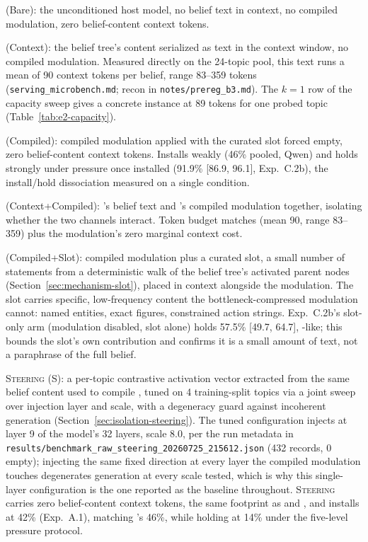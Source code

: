 \condA{} (Bare): the unconditioned host model, no belief text in context, no compiled
modulation, zero belief-content context tokens.

\condB{} (Context): the belief tree's content serialized as text in the context window,
no compiled modulation. Measured directly on the 24-topic pool, this text runs a mean of
90 context tokens per belief, range 83--359 tokens (\texttt{serving\_microbench.md};
recon in \texttt{notes/prereg\_b3.md}). The \(k=1\) row of the capacity sweep gives a
concrete instance at 89 tokens for one probed topic (Table~\ref{tab:e2-capacity}).

\condC{} (Compiled): compiled modulation applied with the curated slot forced empty,
zero belief-content context tokens. Installs weakly (46\% pooled, Qwen) and holds
strongly under pressure once installed (91.9\% [86.9, 96.1], Exp.~C.2b), the
install/hold dissociation measured on a single condition.

\condD{} (Context+Compiled): \condB{}'s belief text and \condC{}'s compiled modulation
together, isolating whether the two channels interact. Token budget matches \condB{}
(mean 90, range 83--359) plus the modulation's zero marginal context cost.

\condF{} (Compiled+Slot): compiled modulation plus a curated slot, a small number of
statements from a deterministic walk of the belief tree's activated parent nodes
(Section~\ref{sec:mechanism-slot}), placed in context alongside the modulation. The slot
carries specific, low-frequency content the bottleneck-compressed modulation cannot:
named entities, exact figures, constrained action strings. Exp.~C.2b's slot-only arm
(modulation disabled, slot alone) holds 57.5\% [49.7, 64.7], \condB{}-like; this bounds
the slot's own contribution and confirms it is a small amount of text, not a
paraphrase of the full belief.

\textsc{Steering} (S): a per-topic contrastive activation vector extracted from the same
belief content used to compile \condF{}, tuned on 4 training-split topics via a joint
sweep over injection layer and scale, with a degeneracy guard against incoherent
generation (Section~\ref{sec:isolation-steering}). The tuned configuration injects at
layer 9 of the model's 32 layers, scale 8.0, per the run metadata in
\texttt{results/benchmark\_raw\_steering\_20260725\_215612.json} (432 records, 0 empty);
injecting the same fixed direction at every layer the compiled modulation touches
degenerates generation at every scale tested, which is why this single-layer
configuration is the one reported as the baseline throughout. \textsc{Steering} carries
zero belief-content context tokens, the same footprint as \condC{} and \condF{}, and
installs at 42\% (Exp.~A.1), matching \condC{}'s 46\%, while holding at 14\% under the
five-level pressure protocol.

